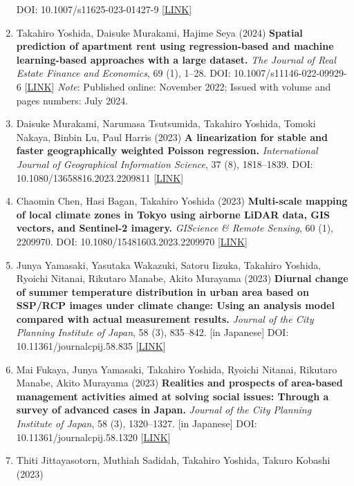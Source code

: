 \documentclass[
]{book}
\begin{document}
\begin{enumerate}
  DOI: 10.1007/s11625-023-01427-9 {[}\href{https://link.springer.com/article/10.1007/s11625-023-01427-9}{LINK}{]}
\item
  Takahiro Yoshida, Daisuke Murakami, Hajime Seya (2024)
  \textbf{Spatial prediction of apartment rent using regression-based and machine learning-based approaches with a large dataset.}
  \emph{The Journal of Real Estate Finance and Economics}, 69 (1), 1--28.
  DOI: 10.1007/s11146-022-09929-6 {[}\href{https://link.springer.com/article/10.1007/s11146-022-09929-6}{LINK}{]}
  \emph{Note}: Published online: November 2022; Issued with volume and pages numbers: July 2024.
\item
  Daisuke Murakami, Narumasa Tsutsumida, Takahiro Yoshida, Tomoki Nakaya, Binbin Lu, Paul Harris (2023)
  \textbf{A linearization for stable and faster geographically weighted Poisson regression.}
  \emph{International Journal of Geographical Information Science}, 37 (8), 1818--1839.
  DOI: 10.1080/13658816.2023.2209811 {[}\href{https://www.tandfonline.com/doi/full/10.1080/13658816.2023.2209811}{LINK}{]}
\item
  Chaomin Chen, Hasi Bagan, Takahiro Yoshida (2023)
  \textbf{Multi-scale mapping of local climate zones in Tokyo using airborne LiDAR data, GIS vectors, and Sentinel-2 imagery.}
  \emph{GIScience \& Remote Sensing}, 60 (1), 2209970.
  DOI: 10.1080/15481603.2023.2209970 {[}\href{https://www.tandfonline.com/doi/full/10.1080/15481603.2023.2209970}{LINK}{]}
\item
  Junya Yamasaki, Yasutaka Wakazuki, Satoru Iizuka, Takahiro Yoshida, Ryoichi Nitanai, Rikutaro Manabe, Akito Murayama (2023)
  \textbf{Diurnal change of summer temperature distribution in urban area based on SSP/RCP images under climate change: Using an analysis model compared with actual measurement results.}
  \emph{Journal of the City Planning Institute of Japan}, 58 (3), 835--842. {[}in Japanese{]}
  DOI: 10.11361/journalcpij.58.835 {[}\href{https://doi.org/10.11361/journalcpij.58.835}{LINK}{]}
\item
  Mai Fukaya, Junya Yamasaki, Takahiro Yoshida, Ryoichi Nitanai, Rikutaro Manabe, Akito Murayama (2023)
  \textbf{Realities and prospects of area-based management activities aimed at solving social issues: Through a survey of advanced cases in Japan.}
  \emph{Journal of the City Planning Institute of Japan}, 58 (3), 1320--1327. {[}in Japanese{]}
  DOI: 10.11361/journalcpij.58.1320 {[}\href{https://doi.org/10.11361/journalcpij.58.1320}{LINK}{]}
\item
  Thiti Jittayasotorn, Muthiah Sadidah, Takahiro Yoshida, Takuro Kobashi (2023)

\end{enumerate}
\end{document}
